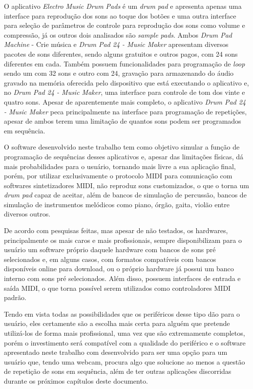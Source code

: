 \documentclass[12pt]{report}
\begin{document}
O aplicativo {\it Electro Music Drum Pads} é um {\it drum pad} e
apresenta apenas uma interface para reprodução dos sons ao toque dos
botões e uma outra interface para seleção de parâmetros de controle
para reprodução dos sons como volume e compressão, já os outros dois
analisados são {\it sample pads}. Ambos {\it Drum Pad Machine} - Crie
música e {\it Drum Pad 24 - Music Maker} apresentam diversos pacotes
de sons diferentes, sendo alguns gratuitos e outros pagos, com 24 sons
diferentes em cada. Também possuem funcionalidades para programação de
{\it loop} sendo um com 32 sons e outro com 24, gravação para
armazenando do áudio gravado na memória oferecida pelo dispositivo que
está executando o aplicativo e, no {\it Drum Pad 24 - Music Maker},
uma interface para controle de tom dos vinte e quatro sons. Apesar de
aparentemente mais completo, o aplicativo {\it Drum Pad 24 - Music
  Maker} peca principalmente na interface para programação de
repetições, apesar de ambos terem uma limitação de quantos sons podem
ser programados em sequência.

O software desenvolvido neste trabalho tem como objetivo simular a
função de programação de sequências desses aplicativos e, apesar das
limitações físicas, dá mais probabilidades para o usuário, tornando
mais livre a sua aplicação final, porém, por utilizar exclusivamente o
protocolo MIDI para comunicação com softwares sintetizadores MIDI, não
reproduz sons customizados, o que o torna um {\it drum pad} capaz de
aceitar, além de bancos de simulação de percussão, bancos de simulação
de instrumentos melódicos como piano, órgão, gaita, violão entre
diversos outros.

De acordo com pesquisas feitas, mas apesar de não testados, os
hardwares, principalmente os mais caros e mais profissionais, sempre
disponibilizam para o usuário um software próprio daquele hardware com
bancos de sons pré selecionados e, em alguns casos, com formatos
compatíveis com bancos disponíveis online para download, ou o próprio
hardware já possui um banco interno com sons pré selecionados. Além
disso, possuem interfaces de entrada e saída MIDI, o que torna
possível serem utilizados como controladores MIDI padrão.

Tendo em vista todas as possibilidades que os periféricos desse tipo
dão para o usuário, eles certamente são a escolha mais certa para
alguém que pretende utilizá-los de forma mais profissional, uma vez
que são extremamente completos, porém o investimento será compatível
com a qualidade do periférico e o software apresentado neste trabalho
com desenvolvido para ser uma opção para um usuário que, tendo uma
webcam, procura algo que solucione ao menos a questão de repetição de
sons em sequência, além de ter outras aplicações discorridas durante
os próximos capítulos deste documento.
\end{document}
